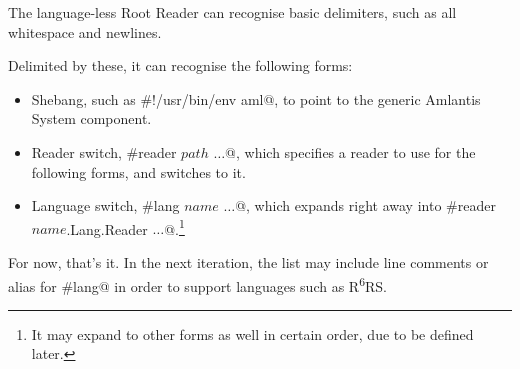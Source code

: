 The language-less Root Reader can recognise basic delimiters, such as all whitespace and newlines. 

Delimited by these, it can recognise the following forms:

\begin{itemize}
  \item Shebang, such as \lstinline@#!/usr/bin/env aml@, to point to the generic Amlantis System component.
  \item Reader switch, \lstinline@#reader $path$ $\ldots$@, which specifies a reader to use for the following forms, and switches to it.
  \item Language switch, \lstinline@#lang $name$ $\ldots$@, which expands right away into \lstinline@#reader $name$.Lang.Reader $\ldots$@.\footnote{It may expand to other forms as well in certain order, due to be defined later.}
\end{itemize}

For now, that's it. In the next iteration, the list may include line comments or alias for \lstinline@#lang@ in order to support languages such as R\textsuperscript{6}RS.




